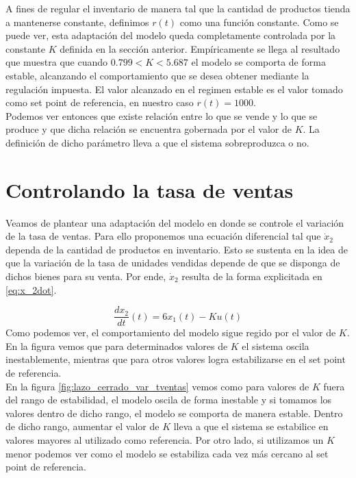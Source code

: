 \documentclass{sig-alternate}
\begin{document}
A fines de regular el inventario de manera tal que la cantidad de productos tienda a mantenerse constante, definimos $r(t)$ como una función
constante.
Como se puede ver, esta adaptación del modelo queda completamente controlada por la constante $K$ definida en la sección anterior. Empíricamente se llega al resultado que muestra que cuando $0.799 < K < 5.687$ el modelo se comporta de forma estable, alcanzando el comportamiento
que se desea obtener mediante la regulación impuesta. El valor alcanzado en el regimen estable
es el valor tomado como set point de referencia, en nuestro caso $r(t) = 1000$.\\
Podemos ver entonces que existe relación entre lo que se vende y lo que se produce y que dicha relación se encuentra gobernada por el valor de
$K$. La definición de dicho parámetro lleva a que el sistema sobreproduzca o no.
    
\section{Controlando la tasa de ventas}
\label{salesrate_control_section}
Veamos de plantear una adaptación del modelo en donde se controle el variación de la tasa de ventas. Para ello proponemos una ecuación diferencial
tal que $\dot{x}_{2}$ dependa de la cantidad de productos en inventario. Esto se sustenta en la idea de que la variación de la tasa de unidades
vendidas depende de que se disponga de dichos bienes para su venta. Por ende, $\dot{x}_{2}$ resulta de la forma explicitada en \eqref{eq:x_2dot}.

\begin{equation}
 \label{eq:x_2dot}
 \frac{dx_{2}}{dt}(t) = 6x_1(t) - Ku(t)
\end{equation}
Como podemos ver, el comportamiento del modelo sigue regido por el valor de $K$. En la figura vemos que para determinados valores de $K$ el sistema
oscila inestablemente, mientras que para otros valores logra estabilizarse en el set point de referencia.\\
En la figura \ref{fig:lazo_cerrado_var_tventas} vemos como para valores de $K$ fuera del rango de estabilidad, el modelo oscila de
forma inestable y si tomamos los valores dentro de dicho rango, el modelo se comporta de manera estable. Dentro de dicho rango, aumentar el 
valor de $K$ lleva a que el sistema se estabilice en valores mayores al utilizado como referencia. Por otro lado, si utilizamos un $K$ menor podemos ver como el 
modelo se estabiliza cada vez más cercano al set point de referencia.
\end{document}
